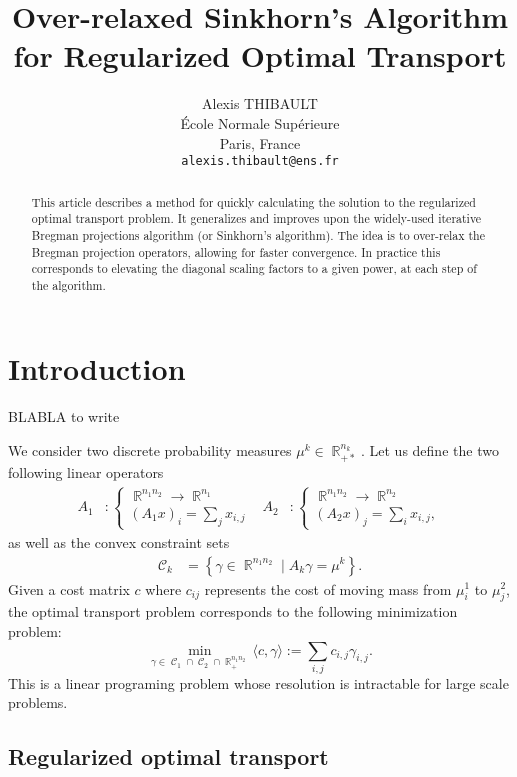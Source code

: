 \documentclass{article} %
\title{Over-relaxed Sinkhorn's Algorithm for Regularized Optimal Transport}
\author{
Alexis THIBAULT\\
\'Ecole Normale Sup\'erieure\\
Paris, France\\
\texttt{alexis.thibault@ens.fr}
}
\DeclareMathOperator{\IR}{\mathbb{R}}
\DeclareMathOperator{\Ccal}{\mathcal{C}}
\theoremstyle{plain}
\theoremstyle{definition}
\theoremstyle{remark}
\begin{document}
\maketitle

\begin{abstract}
This article describes a method for quickly calculating the solution to the regularized optimal transport problem. It generalizes and improves upon the widely-used iterative Bregman projections algorithm (or Sinkhorn's algorithm). The idea is to over-relax the Bregman projection operators, allowing for faster convergence. In practice this corresponds to elevating the diagonal scaling factors to a given power, at each step of the algorithm.
\end{abstract}

\section{Introduction}
BLABLA to write


We consider two discrete probability measures $\mu^k \in \IR_{+*}^{n_k}$.
Let us define the two following linear operators
\begin{align*}
A_1 &: \begin{cases}
\IR^{n_1 n_2} \rightarrow \IR^{n_1} \\
(A_1 x)_i = \sum_j x_{i,j}
\end{cases} &
A_2 &: \begin{cases}
\IR^{n_1 n_2} \rightarrow \IR^{n_2}\\
(A_2 x)_j = \sum_i x_{i,j},
\end{cases}
\end{align*}
as well as the convex constraint sets
\begin{align*}
\Ccal_k &= \left\{ \gamma\in\IR^{n_1 n_2} \mid A_k \gamma = \mu^k \right\}.
\end{align*}
Given a cost matrix $c$ where $c_{ij}$ represents the cost of moving mass from $\mu^1_i$ to $\mu^2_j$,  the optimal transport problem corresponds to the following minimization problem:
$$\min_{\gamma\in\Ccal_1\cap \Ccal_2\cap \IR^{n_1 n_2}_+} \langle c,\gamma\rangle:=\sum_{i,j}c_{i,j}\gamma_{i,j}.$$
This is a linear programing problem whose resolution is intractable for large scale problems. 

\subsection{Regularized optimal transport}
\end{document}
